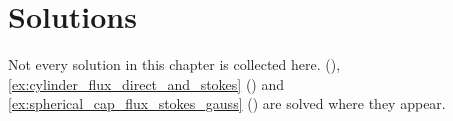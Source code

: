 
\section{Solutions}
\label{sec:stokes_solutions}

Not every solution in this chapter is collected here. 
(), \cref{ex:cylinder_flux_direct_and_stokes}
() and \cref{ex:spherical_cap_flux_stokes_gauss}
() are solved where they appear.


